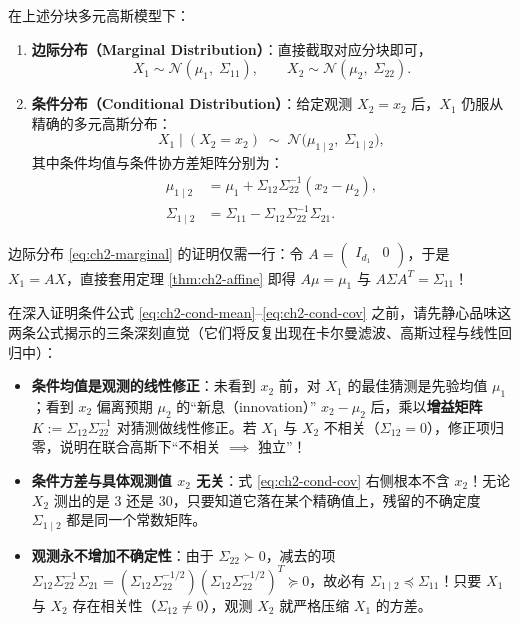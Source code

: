 \begin{thmBox}
\begin{theorem}[多元高斯的边际分布与条件分布]
\label{thm:ch2-cond-mvg}
在上述分块多元高斯模型下：
\begin{enumerate}
  \item \textbf{边际分布（Marginal Distribution）}：直接截取对应分块即可，
  \begin{equation}
    X_1 \sim \mathcal{N}(\mu_1,\; \Sigma_{11}), \qquad X_2 \sim \mathcal{N}(\mu_2,\; \Sigma_{22}). \label{eq:ch2-marginal}
  \end{equation}
  \item \textbf{条件分布（Conditional Distribution）}：给定观测 $X_2 = x_2$ 后，$X_1$ 仍服从精确的多元高斯分布：
  \begin{equation}
    X_1 \mid (X_2 = x_2) \;\sim\; \mathcal{N}\bigl(\mu_{1\mid 2},\; \Sigma_{1\mid 2}\bigr), \label{eq:ch2-cond}
  \end{equation}
  其中条件均值与条件协方差矩阵分别为：
  \begin{align}
    \mu_{1\mid 2} &= \mu_1 + \Sigma_{12}\Sigma_{22}^{-1}(x_2 - \mu_2), \label{eq:ch2-cond-mean} \\
    \Sigma_{1\mid 2} &= \Sigma_{11} - \Sigma_{12}\Sigma_{22}^{-1}\Sigma_{21}. \label{eq:ch2-cond-cov}
  \end{align}
\end{enumerate}
\end{theorem}
\end{thmBox}

边际分布 \eqref{eq:ch2-marginal} 的证明仅需一行：令 $A = \begin{pmatrix} I_{d_1} & 0 \end{pmatrix}$，于是 $X_1 = A X$，直接套用定理 \ref{thm:ch2-affine} 即得 $A\mu = \mu_1$ 与 $A\Sigma A^T = \Sigma_{11}$！

在深入证明条件公式 \eqref{eq:ch2-cond-mean}--\eqref{eq:ch2-cond-cov} 之前，请先静心品味这两条公式揭示的三条深刻直觉（它们将反复出现在卡尔曼滤波、高斯过程与线性回归中）：
\begin{itemize}
  \item \textbf{条件均值是观测的线性修正}：未看到 $x_2$ 前，对 $X_1$ 的最佳猜测是先验均值 $\mu_1$；看到 $x_2$ 偏离预期 $\mu_2$ 的“新息（innovation）” $x_2 - \mu_2$ 后，乘以\textbf{增益矩阵} $K := \Sigma_{12}\Sigma_{22}^{-1}$ 对猜测做线性修正。若 $X_1$ 与 $X_2$ 不相关（$\Sigma_{12} = 0$），修正项归零，说明在联合高斯下“不相关 $\implies$ 独立”！
  \item \textbf{条件方差与具体观测值 $x_2$ 无关}：式 \eqref{eq:ch2-cond-cov} 右侧根本不含 $x_2$！无论 $X_2$ 测出的是 $3$ 还是 $30$，只要知道它落在某个精确值上，残留的不确定度 $\Sigma_{1\mid 2}$ 都是同一个常数矩阵。
  \item \textbf{观测永不增加不确定性}：由于 $\Sigma_{22} \succ 0$，减去的项 $\Sigma_{12}\Sigma_{22}^{-1}\Sigma_{21} = (\Sigma_{12}\Sigma_{22}^{-1/2})(\Sigma_{12}\Sigma_{22}^{-1/2})^T \succeq 0$，故必有 $\Sigma_{1\mid 2} \preceq \Sigma_{11}$！只要 $X_1$ 与 $X_2$ 存在相关性（$\Sigma_{12} \neq 0$），观测 $X_2$ 就严格压缩 $X_1$ 的方差。
\end{itemize}

